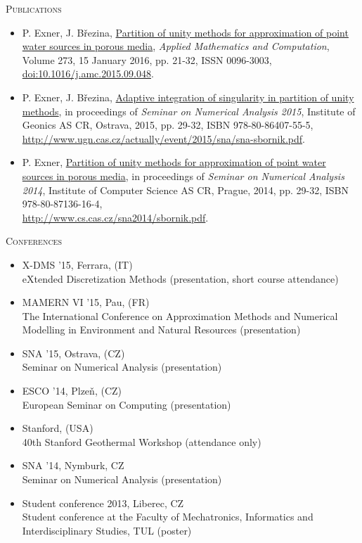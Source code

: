 \documentclass[FM,Dis]{tulthesis}
\begin{document}
\large\textsc{Publications}
\begin{itemize}[label={}]
\item
P. Exner, J. B{\v r}ezina, \href{http://www.sciencedirect.com/science/article/pii/S0096300315012862}{Partition of unity methods for approximation of point water sources in porous media},
\emph{Applied Mathematics and Computation}, Volume 273, 15 January 2016, pp. 21-32, ISSN 0096-3003, \href{http://dx.doi.org/10.1016/j.amc.2015.09.048}{doi:10.1016/j.amc.2015.09.048}.

\item
P. Exner, J. B{\v r}ezina, \href{http://www.ugn.cas.cz/actually/event/2015/sna/sna-sbornik.pdf}{Adaptive integration of singularity in partition of unity methods},
in proceedings of \emph{Seminar on Numerical Analysis 2015}, Institute of Geonics AS CR, Ostrava, 2015, pp. 29-32, ISBN 978-80-86407-55-5, \\
\href{http://www.ugn.cas.cz/actually/event/2015/sna/sna-sbornik.pdf}{http://www.ugn.cas.cz/actually/event/2015/sna/sna-sbornik.pdf}.

\item
P. Exner, \href{http://www.cs.cas.cz/sna2014/sbornik.pdf}{Partition of unity methods for approximation of point water sources in porous media},
in proceedings of \emph{Seminar on Numerical Analysis 2014}, Institute of Computer Science AS CR, Prague, 2014, pp. 29-32, ISBN 978-80-87136-16-4, \\
\href{http://www.cs.cas.cz/sna2014/sbornik.pdf}{http://www.cs.cas.cz/sna2014/sbornik.pdf}.


\end{itemize}
%
\vspace{0.5cm}
%
\large\textsc{Conferences}
%
\begin{itemize}[label={}]
\item X-DMS '15, Ferrara, (IT) \\ eXtended Discretization Methods (presentation, short course attendance)
\item MAMERN VI '15, Pau, (FR) \\ The International Conference on Approximation Methods and Numerical Modelling in Environment and Natural Resources (presentation)
\item SNA '15, Ostrava, (CZ) \\ Seminar on Numerical Analysis (presentation)
\item ESCO '14, Plze{\v n}, (CZ) \\ European Seminar on Computing (presentation)
\item Stanford, (USA) \\ 40th Stanford Geothermal Workshop (attendance only)
\item SNA '14, Nymburk, CZ \\ Seminar on Numerical Analysis (presentation)
\item Student conference 2013, Liberec, CZ \\ Student conference at the Faculty of Mechatronics, Informatics and Interdisciplinary Studies, TUL (poster)
\end{itemize}
\end{document}
